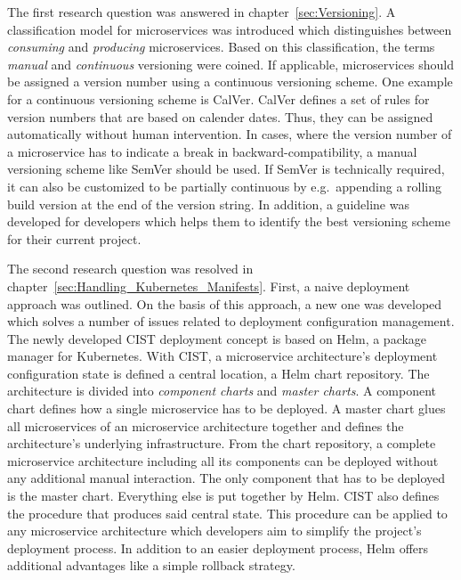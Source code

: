 The first research question was answered in chapter~\ref{sec:Versioning}. A
classification model for microservices was introduced which distinguishes
between \textit{consuming} and \textit{producing} microservices. Based on this
classification, the terms \textit{manual} and \textit{continuous} versioning
were coined. If applicable, microservices should be assigned a version number
using a continuous versioning scheme. One example for a continuous versioning
scheme is CalVer. CalVer defines a set of rules for version numbers that are
based on calender dates. Thus, they can be assigned automatically without human
intervention. In cases, where the version number of a microservice has to
indicate a break in backward-compatibility, a manual versioning scheme like
SemVer should be used. If SemVer is technically required, it can also be
customized to be partially continuous by e.g.\ appending a rolling build
version at the end of the version string. In addition, a guideline was
developed for developers which helps them to identify the best versioning
scheme for their current project.

The second research question was resolved in
chapter~\ref{sec:Handling_Kubernetes_Manifests}. First, a naive deployment
approach was outlined. On the basis of this approach, a new one was developed
which solves a number of issues related to deployment configuration management.
The newly developed \ac{CIST} deployment concept is based on Helm, a package
manager for Kubernetes. With \ac{CIST}, a microservice architecture's
deployment configuration state is defined a central location, a Helm chart
repository. The architecture is divided into \textit{component charts} and
\textit{master charts}. A component chart defines how a single microservice has
to be deployed. A master chart glues all microservices of an microservice
architecture together and defines the architecture's underlying infrastructure.
From the chart repository, a complete microservice architecture including all
its components can be deployed without any additional manual interaction. The
only component that has to be deployed is the master chart. Everything else is
put together by Helm. \ac{CIST} also defines the procedure that produces said
central state. This procedure can be applied to any microservice architecture
which developers aim to simplify the project's deployment process. In addition
to an easier deployment process, Helm offers additional advantages like a
simple rollback strategy.

